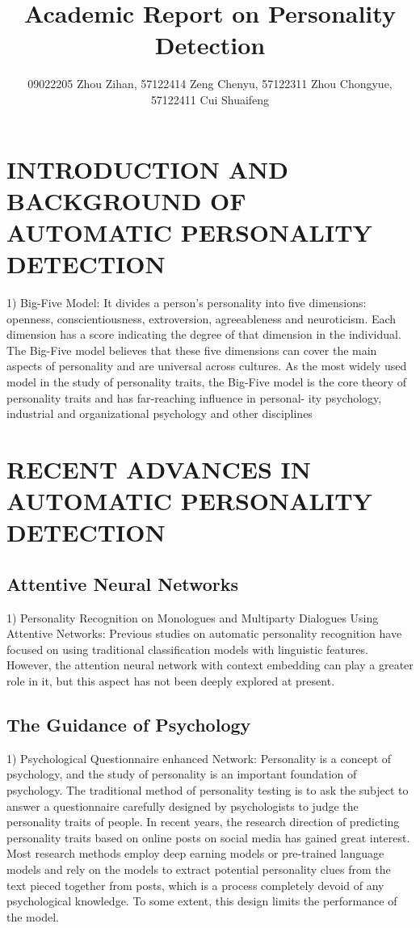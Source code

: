 \documentclass{article}
\title{Academic Report on Personality Detection}
\author{09022205 Zhou Zihan, 57122414 Zeng Chenyu, 57122311 Zhou Chongyue, 57122411 Cui Shuaifeng
}
\begin{document}
\maketitle

\section{INTRODUCTION AND BACKGROUND OF AUTOMATIC PERSONALITY DETECTION}

1)  Big-Five Model:  It divides  a person’s personality into five  dimensions:   openness,  conscientiousness,  extroversion, agreeableness  and neuroticism. Each  dimension has  a  score indicating  the  degree  of  that  dimension  in  the  individual. The Big-Five model believes that these five dimensions can cover the main aspects of personality and are universal across cultures.  As  the  most  widely  used  model  in  the  study  of personality  traits,  the  Big-Five  model  is  the  core  theory  of personality traits and has far-reaching influence in personal- ity psychology, industrial and organizational psychology and other disciplines

\section{ RECENT ADVANCES IN AUTOMATIC PERSONALITY
DETECTION}

\subsection{Attentive Neural Networks}

1) Personality Recognition on Monologues and Multiparty
Dialogues Using Attentive Networks: Previous studies on
automatic personality recognition have focused on using traditional classification models with linguistic features. However,
the attention neural network with context embedding can play
a greater role in it, but this aspect has not been deeply explored
at present.

\subsection{The Guidance of Psychology}

1) Psychological Questionnaire enhanced Network: Personality is a concept of psychology, and the study
of personality is an important foundation of psychology. The
traditional method of personality testing is to ask the subject
to answer a questionnaire carefully designed by psychologists
to judge the personality traits of people. In recent years, the
research direction of predicting personality traits based on
online posts on social media has gained great interest. Most
research methods employ deep earning models or pre-trained
language models and rely on the models to extract potential
personality clues from the text pieced together from posts,
which is a process completely devoid of any psychological
knowledge. To some extent, this design limits the performance
of the model.
\end{document}
